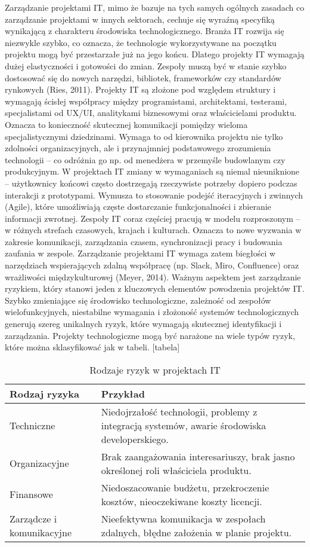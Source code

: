 Zarządzanie projektami IT, mimo że bazuje na tych samych ogólnych zasadach co zarządzanie projektami w innych sektorach, cechuje się wyraźną specyfiką wynikającą z charakteru środowiska technologicznego. Branża IT rozwija się niezwykle szybko, co oznacza, że technologie wykorzystywane na początku projektu mogą być przestarzałe już na jego końcu. Dlatego projekty IT wymagają dużej elastyczności i gotowości do zmian. Zespoły muszą być w stanie szybko dostosować się do nowych narzędzi, bibliotek, frameworków czy standardów rynkowych (Ries, 2011). Projekty IT są złożone pod względem struktury i wymagają ścisłej współpracy między programistami, architektami, testerami, specjalistami od UX/UI, analitykami biznesowymi oraz właścicielami produktu. Oznacza to konieczność skutecznej komunikacji pomiędzy wieloma specjalistycznymi dziedzinami. Wymaga to od kierownika projektu nie tylko zdolności organizacyjnych, ale i przynajmniej podstawowego zrozumienia technologii – co odróżnia go np. od menedżera w przemyśle budowlanym czy produkcyjnym. W projektach IT zmiany w wymaganiach są niemal nieuniknione – użytkownicy końcowi często dostrzegają rzeczywiste potrzeby dopiero podczas interakcji z prototypami. Wymusza to stosowanie podejść iteracyjnych i zwinnych (Agile), które umożliwiają częste dostarczanie funkcjonalności i zbieranie informacji zwrotnej. Zespoły IT coraz częściej pracują w modelu rozproszonym – w różnych strefach czasowych, krajach i kulturach. Oznacza to nowe wyzwania w zakresie komunikacji, zarządzania czasem, synchronizacji pracy i budowania zaufania w zespole. Zarządzanie projektami IT wymaga zatem biegłości w narzędziach wspierających zdalną współpracę (np. Slack, Miro, Confluence) oraz wrażliwości międzykulturowej (Meyer, 2014). 
Ważnym aspektem jest zarządzanie ryzykiem, który stanowi jeden z kluczowych elementów powodzenia projektów IT. Szybko zmieniające się środowisko technologiczne, zależność od zespołów wielofunkcyjnych, niestabilne wymagania i złożoność systemów technologicznych generują szereg unikalnych ryzyk, które wymagają skutecznej identyfikacji i zarządzania. Projekty technologiczne mogą być narażone na wiele typów ryzyk, które można sklasyfikować jak w tabeli. [tabela]
\begin{table}[htbp]
\centering
\small
\begin{tabular}{|p{3.5cm}|p{9cm}|}
\hline
\textbf{Rodzaj ryzyka} & \textbf{Przykład} \\
\hline
Techniczne & Niedojrzałość technologii, problemy z integracją systemów, awarie środowiska developerskiego. \\
\hline
Organizacyjne & Brak zaangażowania interesariuszy, brak jasno określonej roli właściciela produktu. \\
\hline
Finansowe & Niedoszacowanie budżetu, przekroczenie kosztów, nieoczekiwane koszty licencji. \\
\hline
Zarządcze i komunikacyjne & Nieefektywna komunikacja w zespołach zdalnych, błędne założenia w planie projektu. \\
\hline
\end{tabular}
\caption{Rodzaje ryzyk w projektach IT}
\label{tab:it-project-risks}
\end{table}
